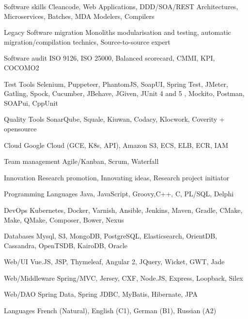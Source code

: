 

\begin{cvskills}

  \cvskill
  {Software skills} %
  {Cleancode, Web Applications, DDD/SOA/REST Architectures, Microservices, Batches, MDA Modelers, Compilers} %


  \cvskill
  {Legacy Software migration} %
  {Monoliths modularisation and testing, automatic migration/compilation technics, Source-to-source expert} %


  \cvskill
  {Software audit} %
  {ISO 9126, ISO 25000, Balanced scorecard, CMMI, KPI, COCOMO2} %

  \cvskill
  {Test Tools} %
  {Selenium, Puppeteer, PhantomJS, SoapUI, Spring Test, JMeter, Gatling, Spock, Cucumber, JBehave, JGiven, JUnit 4 and 5 , Mockito, Postman, SOAPui, CppUnit} %

  \cvskill
  {Quality Tools} %
  {SonarQube, Squale, Kiuwan, Codacy, Klocwork, Coverity + opensource} %


  \cvskill
  {Cloud} %
  {Google Cloud (GCE, K8s, API), Amazon S3, ECS, ELB, ECR, IAM} %


  \cvskill
  {Team management} %
  {Agile/Kanban, Scrum, Waterfall} %

  \cvskill
  {Innovation} %
  {Research promotion, Innovating ideas, Research project initiator} %

  \cvskill
  {Programming Languages} %
  {Java, JavaScript, Groovy,C++, C, PL/SQL, Delphi} %
  
  \cvskill
  {DevOps} %
  {Kubernetes, Docker, Varnish, Ansible, Jenkins, Maven, Gradle, CMake, Make, QMake, Composer, Bower, Nexus} %
  
  \cvskill
  {Databases} %
  {Mysql, S3, MongoDB, PostgreSQL, Elasticsearch, OrientDB, Cassandra, OpenTSDB, KairoDB, Oracle} %
  
  \cvskill
  {Web/UI} %
  {Vue.JS, JSP, Thymeleaf, Angular 2, JQuery, Wicket, GWT, Jade} %
  
  \cvskill
  {Web/Middleware} %
  {Spring/MVC, Jersey, CXF, Node.JS, Express, Loopback, Silex} %
  
  
  \cvskill
  {Web/DAO} %
  {Spring Data, Spring JDBC, MyBatis, Hibernate, JPA} %
  

  \cvskill
    {Languages} %
    {French (Natural), English (C1), German (B1), Russian (A2)} %

\end{cvskills}
